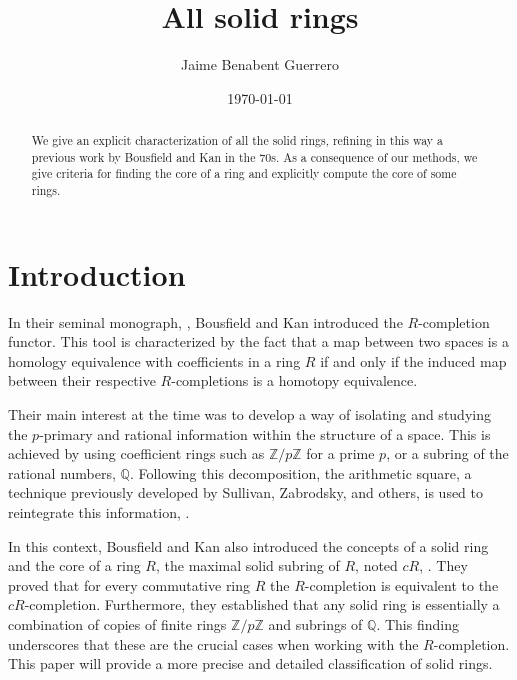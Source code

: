 \documentclass{amsart}
\title{All solid rings}
\author{Jaime Benabent Guerrero}
\date{\today}
\newcommand{\Z}{{\mathbb Z}}
\newcommand{\Q}{{\mathbb Q}}
\begin{document}
	
	\begin{abstract}
		We give an explicit characterization of all the solid rings, refining in this way a previous work by Bousfield and Kan in the 70s.
        As a consequence of our methods, we give criteria for finding the core of a ring and explicitly compute the core of some rings.
	\end{abstract}
	
	\maketitle

	
	\section{Introduction}
    \noindent


    In their seminal monograph, \cite{BK72}, Bousfield and Kan introduced the $R$-completion functor.
    This tool is characterized by the fact that a map between two spaces is a homology equivalence with coefficients in a ring $R$ if and only if the induced map between their respective $R$-completions is a homotopy equivalence.

    Their main interest at the time was to develop a way of isolating and studying the $p$-primary and rational information within the structure of a space.
    This is achieved by using coefficient rings such as $\Z/p\Z$ for a prime $p$, or a subring of the rational numbers, $\Q$.
    Following this decomposition, the arithmetic square, a technique previously developed by Sullivan, Zabrodsky, and others, is used to reintegrate this information, \cite{Sul70}.
    
    In this context, Bousfield and Kan also introduced the concepts of a solid ring and the core of a ring $R$, the maximal solid subring of $R$, noted $cR$, \cite{BK71}.
    They proved that for every commutative ring $R$ the $R$-completion is equivalent to the $cR$-completion.
    Furthermore, they established that any solid ring is essentially a combination of copies of finite rings $\Z/p\Z$ and subrings of $\mathbb{Q}$.
    This finding underscores that these are the crucial cases when working with the $R$-completion.
    This paper will provide a more precise and detailed classification of solid rings.\\
\end{document}
